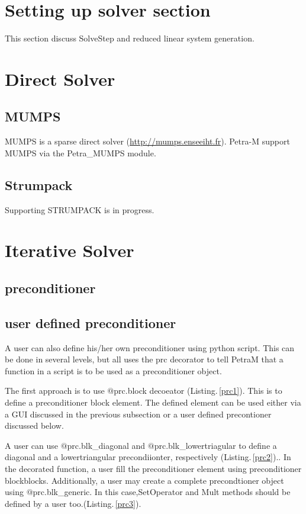 \documentclass[11pt,a4paper,draft]{report}
\begin{document}
\section{Setting up solver section}
This section discuss SolveStep and reduced linear system generation.

\section{Direct Solver}
\subsection{MUMPS}
MUMPS is a sparse direct solver (\url{http://mumps.enseeiht.fr}). Petra-M support MUMPS via the Petra\_MUMPS module. 
\subsection{Strumpack}
Supporting STRUMPACK is in progress.
\section{Iterative Solver}
\subsection{preconditioner}


\subsection{user defined preconditioner}
A user can also define his/her own preconditioner using python script.  This can be done in several levels, but all
uses the prc decorator to tell PetraM that a function in a script is to be used as a preconditioner object.

The first approach is to use $@$prc.block decoeator (Listing.\,\ref{prc1}). This is to define a preconditioner block element.  The defined element can be used either via a GUI discussed in the previous subsection or a user defined precontioner discussed below.  


A user can use $@$prc.blk\_diagonal and $@$prc.blk\_lowertriagular to define a diagonal and a lowertriangular precondiionter, respectively (Listing.\,\ref{prc2}).. In the decorated function, a user fill the preconditioner element using preconditioner blockblocks. Additionally, a user may create a complete precondtioner object using $@$prc.blk\_generic. In this case,SetOperator and Mult methods should be defined  by a user too.(Listing.\,\ref{prc3}). 
\end{document}
